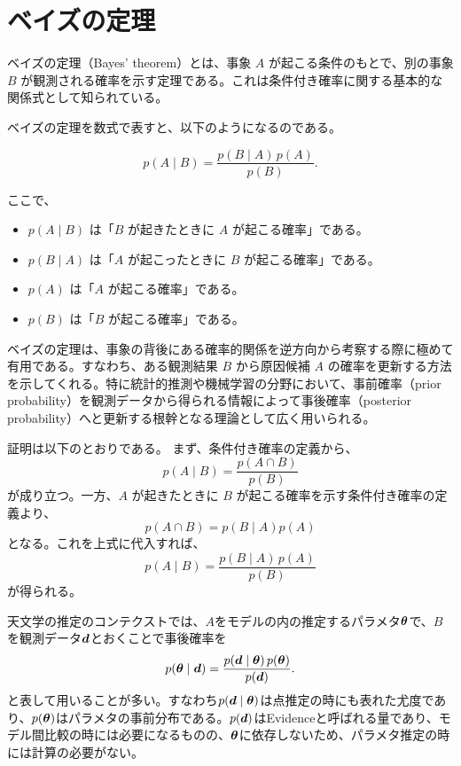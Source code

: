 \section{ベイズの定理}

ベイズの定理（Bayes' theorem）とは、事象 $A$ が起こる条件のもとで、別の事象 $B$ が観測される確率を示す定理である。これは条件付き確率に関する基本的な関係式として知られている。

ベイズの定理を数式で表すと、以下のようになるのである。

\[
p(A \mid B) = \frac{p(B \mid A)\,p(A)}{p(B)}.
\]

ここで、
\begin{itemize}
  \item $p(A \mid B)$ は「$B$ が起きたときに $A$ が起こる確率」である。
  \item $p(B \mid A)$ は「$A$ が起こったときに $B$ が起こる確率」である。
  \item $p(A)$ は「$A$ が起こる確率」である。
  \item $p(B)$ は「$B$ が起こる確率」である。
\end{itemize}

ベイズの定理は、事象の背後にある確率的関係を逆方向から考察する際に極めて有用である。すなわち、ある観測結果 $B$ から原因候補 $A$ の確率を更新する方法を示してくれる。特に統計的推測や機械学習の分野において、事前確率（prior probability）を観測データから得られる情報によって事後確率（posterior probability）へと更新する根幹となる理論として広く用いられる。

証明は以下のとおりである。
まず、条件付き確率の定義から、
\[
p(A \mid B) = \frac{p(A \cap B)}{p(B)}
\]
が成り立つ。一方、$A$ が起きたときに $B$ が起こる確率を示す条件付き確率の定義より、
\[
p(A \cap B) = p(B \mid A) p(A)
\]
となる。これを上式に代入すれば、
\[
p(A \mid B) = \frac{p(B \mid A)\,p(A)}{p(B)}
\]
が得られる。

天文学の推定のコンテクストでは、$A$をモデルの内の推定するパラメタ$\boldsymbol{\theta}$で、$B$を観測データ$\boldsymbol{d}$とおくことで事後確率を
\[
p(\boldsymbol{\theta} \mid \boldsymbol{d}) = \frac{p(\boldsymbol{d} \mid \boldsymbol{\theta})\,p(\boldsymbol{\theta})}{p(\boldsymbol{d})}.
\]
と表して用いることが多い。すなわち$p(\boldsymbol{d} \mid \boldsymbol{\theta})$は点推定の時にも表れた尤度であり、$p(\boldsymbol{\theta})$はパラメタの事前分布である。$p(\boldsymbol{d})$はEvidenceと呼ばれる量であり、モデル間比較の時には必要になるものの、$\boldsymbol{\theta}$に依存しないため、パラメタ推定の時には計算の必要がない。



